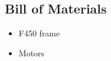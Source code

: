 








\begin{appendices}

\chapter{Bill of Materials}

\begin{itemize}
	\item F450 frame \cite{greenwade93}
	\item Motors \cite{gopher}
\end{itemize}

\end{appendices}

\newpage

%


